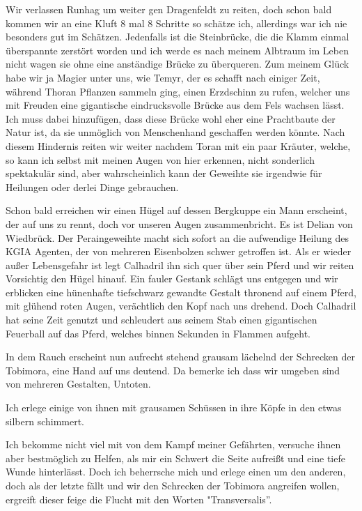 Wir verlassen Runhag um weiter gen Dragenfeldt  zu reiten, doch schon bald kommen wir an eine Kluft 8 mal 8 Schritte so schätze ich, allerdings war ich nie besonders gut im Schätzen. Jedenfalls ist die Steinbrücke, die die Klamm einmal überspannte zerstört worden und ich werde es nach meinem Albtraum im Leben nicht wagen sie ohne eine anständige Brücke zu überqueren. Zum meinem Glück habe wir ja Magier unter uns, wie Temyr, der es schafft nach einiger Zeit, während Thoran Pflanzen sammeln ging, einen Erzdschinn zu rufen, welcher uns mit Freuden eine gigantische
eindrucksvolle Brücke aus dem Fels wachsen lässt. Ich muss dabei hinzufügen, dass diese Brücke wohl eher eine Prachtbaute der Natur ist, da sie unmöglich von Menschenhand geschaffen werden könnte. Nach diesem Hindernis reiten wir weiter nachdem Toran mit ein paar Kräuter, welche, so kann ich selbst mit meinen Augen von hier erkennen, nicht sonderlich spektakulär sind, aber wahrscheinlich kann der Geweihte sie irgendwie für Heilungen oder derlei Dinge gebrauchen.\par
Schon bald erreichen wir einen Hügel auf dessen Bergkuppe ein Mann erscheint, der auf uns zu rennt, doch vor unseren Augen zusammenbricht. Es ist Delian von Wiedbrück. Der Peraingeweihte macht sich sofort an die aufwendige Heilung des KGIA Agenten, der von mehreren Eisenbolzen schwer getroffen ist. Als er wieder außer Lebensgefahr ist legt Calhadril ihn sich quer über sein Pferd und wir reiten Vorsichtig den Hügel hinauf. Ein fauler Gestank schlägt uns entgegen und wir erblicken eine hünenhafte tiefschwarz gewandte Gestalt thronend auf einem Pferd, mit glühend roten Augen, verächtlich den Kopf nach uns drehend. Doch Calhadril hat seine Zeit genutzt und schleudert aus seinem Stab einen gigantischen Feuerball auf das Pferd, welches binnen Sekunden in Flammen aufgeht.\par
In dem Rauch erscheint nun aufrecht stehend grausam lächelnd der Schrecken der Tobimora, eine Hand auf uns deutend. Da bemerke ich dass wir umgeben sind von mehreren Gestalten, Untoten.\par
Ich erlege einige von ihnen mit grausamen Schüssen in ihre Köpfe in den etwas silbern schimmert.\par
Ich bekomme nicht viel mit von dem Kampf meiner Gefährten, versuche ihnen aber bestmöglich zu Helfen, als mir ein Schwert die Seite aufreißt und eine tiefe Wunde hinterlässt. Doch ich beherrsche mich und erlege einen um den anderen, doch als der letzte fällt und wir den Schrecken der Tobimora angreifen wollen, ergreift dieser feige die Flucht mit den Worten "Transversalis''.\par
